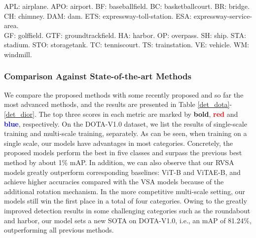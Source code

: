 \documentclass[10pt, journal,twoside]{IEEEtran}
\begin{document}
\begin{table*}[ht]
\begin{threeparttable}
{\begin{tabular}{l|l|l|cccccccccccccccccccc|c}
  \hline
\end{tabular}
  }
  \begin{tablenotes}
    \scriptsize
    \item[1] APL: airplane. APO: airport. BF: baseballfield. BC: basketballcourt. BR: bridge. CH: chimney. DAM: dam. ETS: expressway-toll-station. ESA: expressway-service-area. \\ GF: golffield. GTF: groundtrackfield. HA: harbor. OP: overpass. SH: ship. STA: stadium. STO: storagetank. TC: tenniscourt. TS: trainstation. VE: vehicle. WM: windmill.
  \end{tablenotes}
  \end{threeparttable}
  \label{det_dior}
\end{table*}


\subsubsection{Comparison Against State-of-the-art Methods}
We compare the proposed methods with some recently proposed and so far the most advanced methods, and the results are presented in Table \ref{det_dota}-\ref{det_dior}. The top three scores in each metric are marked by \textbf{bold}, \textbf{\textcolor{red}{red}} and \textbf{\textcolor{blue}{blue}}, respectively. On the DOTA-V1.0 dataset, we list the results of single-scale training and multi-scale training, separately. As can be seen, when training on a single scale, our models have advantages in most categories. Concretely, the proposed models perform the best in five classes and surpass the previous best method by about 1\% mAP. In addition, we can also observe that our RVSA models greatly outperform corresponding baselines: ViT-B and ViTAE-B, and achieve higher accuracies compared with the VSA models because of the additional rotation mechanism. In the more competitive multi-scale setting, our models still win the first place in a total of four categories. Owing to the greatly improved detection results in some challenging categories such as the roundabout and harbor, our model sets a new SOTA on DOTA-V1.0, i.e., an mAP of 81.24\%, outperforming all previous methods. 
\end{document}
